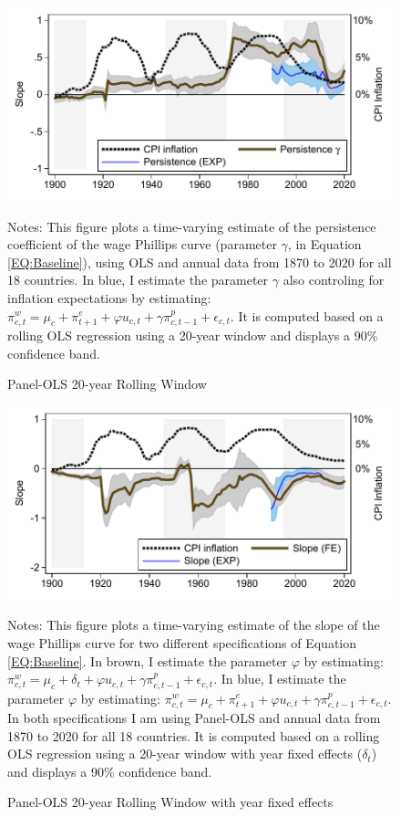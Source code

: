 \documentclass[12pt]{article}
\newcommand{\annote}[1]{\parbox{\textwidth}{\renewcommand{\baselinestretch}{1.0}\vspace{12pt} \footnotesize Notes: #1}}
\begin{document}
\begin{appendices}
\begin{figure}[h!]
    \centering
    \caption{Panel-OLS 20-year Rolling Window}
    \includegraphics[scale=0.9]{../Output/Figures/RW_cpi_OLS}
    \annote{\footnotesize This figure plots a time-varying estimate of the persistence coefficient of the wage Phillips curve (parameter $\gamma$, in Equation \eqref{EQ:Baseline}), using OLS and annual data from 1870 to 2020 for all 18 countries. In blue, I estimate the parameter $\gamma$ also controling for inflation expectations by estimating: $\pi_{c,t}^w = \mu_c + \pi_{t+1}^e + \varphi u_{c,t} + \gamma \pi_{c,t-1}^p + \epsilon_{c,t}$. It is computed based on a rolling OLS regression using a 20-year window and displays a 90\% confidence band.}
    \label{F:RWIV_gamma}
\end{figure}

\begin{figure}[h!]
    \centering
    \caption{Panel-OLS 20-year Rolling Window with year fixed effects}
    \includegraphics[scale=0.9]{../Output/Figures/RW_dwn_OLS_year}
    \annote{\footnotesize This figure plots a time-varying estimate of the slope of the wage Phillips curve for two different specifications of Equation \eqref{EQ:Baseline}. In brown, I estimate the parameter $\varphi$  by estimating: $\pi_{c,t}^w = \mu_c + \delta_t + \varphi u_{c,t} + \gamma \pi_{c,t-1}^p + \epsilon_{c,t}$. In blue, I estimate the parameter $\varphi$  by estimating: $\pi_{c,t}^w = \mu_c + \pi_{t+1}^e + \varphi u_{c,t} + \gamma \pi_{c,t-1}^p + \epsilon_{c,t}$. In both specifications I am using Panel-OLS and annual data from 1870 to 2020 for all 18 countries. It is computed based on a rolling OLS regression using a 20-year window with year fixed effects ($\delta_t$) and displays a 90\% confidence band.}
    \label{F:RWIV2}
\end{figure}



\end{appendices}
\end{document}
